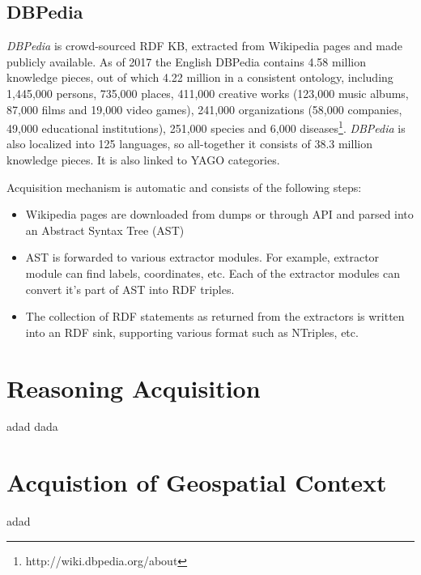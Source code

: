 \subsection{DBPedia}
\label{section_rw:dbpedia}
\emph{DBPedia} is crowd-sourced RDF KB, extracted from Wikipedia pages and made
publicly available. As of 2017 the English DBPedia contains 4.58 million 
knowledge pieces, out of which 4.22 million in a consistent ontology, 
including 1,445,000 persons, 735,000 places, 411,000 creative works
(123,000 music albums, 87,000 films and 19,000 video games), 
241,000 organizations (58,000 companies, 49,000 educational institutions), 
251,000 species and 6,000 diseases\footnote{http://wiki.dbpedia.org/about}.
\emph{DBPedia} is also localized into 125 languages, so all-together it 
consists of 38.3 million knowledge pieces. It is also linked to YAGO categories.

Acquisition mechanism is automatic and consists of the following steps:
\begin{itemize}
\item Wikipedia pages are downloaded from dumps or through API and parsed into
an Abstract Syntax Tree (AST)
\item  AST is forwarded to various extractor modules. For example, extractor
module can find labels, coordinates, etc. Each of the extractor modules can
convert it's part of AST into RDF triples.
\item The collection of RDF statements as returned from the extractors is 
written into an RDF sink, supporting various format such as NTriples, etc.
\end{itemize}

\section{Reasoning Acquisition}
adad dada



\section{Acquistion of Geospatial Context}
adad
